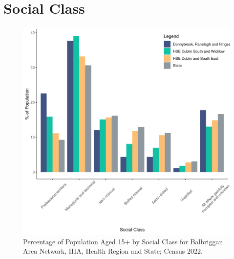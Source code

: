\documentclass{article}
\begin{document}
\section{Social Class}\label{sect:SC}
\begin{figure}[H]
	\centering
	\includegraphics[width = 140mm]{../figures/SocialClassED.pdf}
	\caption{Percentage of Population Aged 15+ by Social Class for Balbriggan Area Network, IHA, Health Region and State; Census 2022.}
	\label{fig:vbnv}
	\end{figure}
\end{document}
